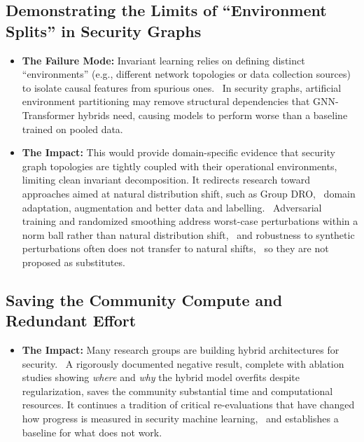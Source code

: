 \documentclass[a4paper,10pt]{article}
\begin{document}
\subsection{Demonstrating the Limits of ``Environment Splits'' in Security Graphs}

\begin{itemize}
    \item \textbf{The Failure Mode:} Invariant learning relies on defining distinct ``environments'' (e.g., different network topologies or data collection sources) to isolate causal features from spurious ones.~\cite{rosenfeld2021risks,wu2022eerm} In security graphs, artificial environment partitioning may remove structural dependencies that GNN-Transformer hybrids need, causing models to perform worse than a baseline trained on pooled data.
    \item \textbf{The Impact:} This would provide domain-specific evidence that security graph topologies are tightly coupled with their operational environments, limiting clean invariant decomposition. It redirects research toward approaches aimed at natural distribution shift, such as Group DRO,~\cite{sagawa2020dro} domain adaptation, augmentation and better data and labelling.~\cite{bilot2025simpler,engelen2021cicids} Adversarial training and randomized smoothing address worst-case perturbations within a norm ball rather than natural distribution shift,~\cite{cohen2019smoothing} and robustness to synthetic perturbations often does not transfer to natural shifts,~\cite{taori2020natural} so they are not proposed as substitutes.
\end{itemize}

\subsection{Saving the Community Compute and Redundant Effort}

\begin{itemize}
    \item \textbf{The Impact:} Many research groups are building hybrid architectures for security.~\cite{xie2026hybrid,appiahene2026hybrid,zhang2024icist} A rigorously documented negative result, complete with ablation studies showing \emph{where} and \emph{why} the hybrid model overfits despite regularization, saves the community substantial time and computational resources. It continues a tradition of critical re-evaluations that have changed how progress is measured in security machine learning,~\cite{bilot2025simpler,arp2022dos,engelen2021cicids,sommer2010closed} and establishes a baseline for what does not work.
\end{itemize}



\end{document}
